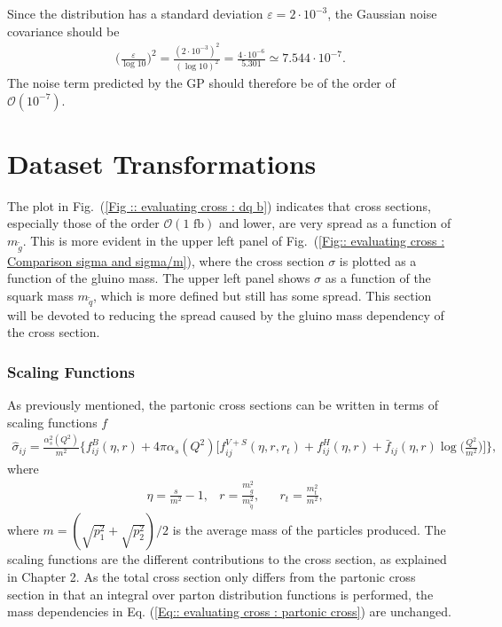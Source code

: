 \documentclass[twoside,english]{uiofysmaster}
\begin{document}
Since the distribution has a standard deviation $\varepsilon = 2 \cdot 10^{-3}$, the Gaussian noise covariance should be
\begin{align*}
\Big( \frac{\varepsilon}{\log 10} \Big)^2 = \frac{(2 \cdot 10^{-3})^2}{(\log 10)^2} = \frac{4 \cdot 10^{-6}}{5.301} \simeq 7.544 \cdot 10^{-7}.
\end{align*}
The noise term predicted by the GP should therefore be of the order of $\mathcal{O}(10^{-7})$.


\section{Dataset Transformations}

The plot in Fig.\ (\ref{Fig :: evaluating cross : dq b}) indicates that cross sections, especially those of the order $\mathcal{O}(1 \text{ fb})$ and lower, are very spread as a function of $m_{\tilde{g}}$. This is more evident in the upper left panel of Fig.\ (\ref{Fig:: evaluating cross : Comparison sigma and sigma/m}), where the cross section $\sigma$ is plotted as a function of the gluino mass. The upper left panel shows $\sigma$ as a function of the squark mass $m_{\tilde{q}}$, which is more defined but still has some spread. This section will be devoted to reducing the spread caused by the gluino mass dependency of the cross section.

\subsubsection{Scaling Functions}

As previously mentioned, the partonic cross sections can be written in terms of scaling functions $f$
\begin{align}\label{Eq:: evaluating cross : partonic cross}
\hat{\sigma}_{ij} = \frac{\alpha^2_s (Q^2)}{m^2} \Bigg\{ f^B_{ij}(\eta, r) + 4 \pi \alpha_s (Q^2) \Bigg[ f^{V+S}_{ij}(\eta, r, r_t) + f^H_{ij}(\eta, r) + \bar{f}_{ij} (\eta, r) \log \Big( \frac{Q^2}{m^2} \Big) \Bigg] \Bigg\},
\end{align}
where 
\begin{align*}
&\eta = \frac{s}{m^2} - 1, &r = \frac{m_{\tilde{g}}^2}{m_{\tilde{q}}^2}, &&r_t = \frac{m_t^2}{m^2},
\end{align*}
where $m = (\sqrt{p_1^2} + \sqrt{p_2^2} )/2$ is the average mass of the particles produced. The scaling functions are the different contributions to the cross section, as explained in Chapter 2. As the total cross section only differs from the partonic cross section in that an integral over parton distribution functions is performed, the mass dependencies in Eq. (\ref{Eq:: evaluating cross : partonic cross}) are unchanged.
\end{document}

